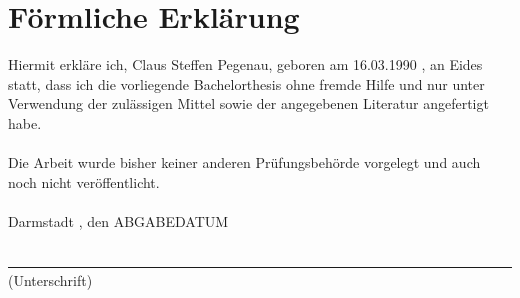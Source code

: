%
%
%
%

\section*{Förmliche Erklärung}
Hiermit erkläre ich, Claus Steffen Pegenau, geboren am 16.03.1990
, an Eides statt, dass ich die vorliegende Bachelorthesis ohne 
fremde Hilfe und nur unter Verwendung der zulässigen Mittel sowie der 
angegebenen Literatur angefertigt habe.
\\
\\
Die Arbeit wurde bisher keiner anderen Prüfungsbehörde vorgelegt und auch noch
nicht veröffentlicht.
\\
\vspace*{4.5cm}
\\

\noindent Darmstadt , den \lbrack ABGABEDATUM\rbrack
\\
\vspace*{3.5cm}\\
\underline{~~~~~~~~~~~~~~~~~~~~~~~~~~~~~~~~~~~~~~~~~~~~~~~~~~~~~~~~~~~~~~~~~~~~~~~~}\\(Unterschrift)
\normalsize


